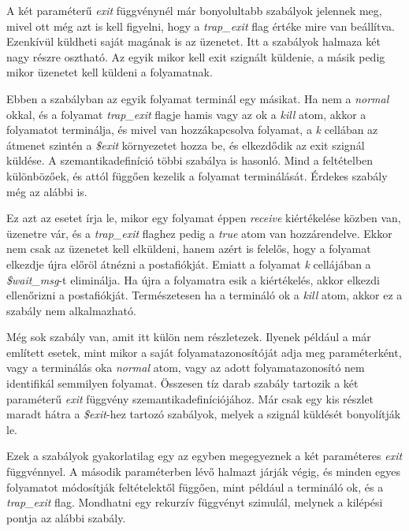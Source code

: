 A két paraméterű \textit{exit} függvénynél már bonyolultabb szabályok jelennek meg, mivel ott még azt is kell figyelni, hogy a \textit{trap\_exit} flag értéke mire van beállítva. Ezenkívül küldheti saját magának is az üzenetet. Itt a szabályok halmaza két nagy részre osztható. Az egyik mikor kell exit szignált küldenie, a másik pedig mikor üzenetet kell küldeni a folyamatnak.



Ebben a szabályban az egyik folyamat terminál egy másikat. Ha nem a \textit{normal} okkal, és a folyamat \textit{trap\_exit} flagje hamis vagy az ok a \textit{kill} atom, akkor a folyamatot terminálja, és mivel van hozzákapcsolva folyamat, a \textit{k} cellában az átmenet szintén a \textit{\$exit} környezetet hozza be, és elkezdődik az exit szignál küldése. A szemantikadefiníció többi szabálya is hasonló. Mind a feltételben különbözőek, és attól függően kezelik a folyamat terminálását. Érdekes szabály még az alábbi is.



Ez azt az esetet írja le, mikor egy folyamat éppen \textit{receive} kiértékelése közben van, üzenetre vár, és a \textit{trap\_exit} flaghez pedig a \textit{true} atom van hozzárendelve. Ekkor nem csak az üzenetet kell elküldeni, hanem azért is felelős, hogy a folyamat elkezdje újra előröl átnézni a postafiókját. Emiatt a folyamat \textit{k} cellájában a \textit{\$wait\_msg}-t eliminálja. Ha újra a folyamatra esik a kiértékelés, akkor elkezdi ellenőrizni a postafiókját. Természetesen ha a termináló ok a \textit{kill} atom, akkor ez a szabály nem alkalmazható.

Még sok szabály van, amit itt külön nem részletezek. Ilyenek például a már említett esetek, mint mikor a saját folyamatazonosítóját adja meg paraméterként, vagy a terminálás oka \textit{normal} atom, vagy az adott folyamatazonosító nem identifikál semmilyen folyamat. Összesen tíz darab szabály tartozik a két paraméterű \textit{exit} függvény szemantikadefiníciójához. Már csak egy kis részlet maradt hátra a \textit{\$exit}-hez tartozó szabályok, melyek a szignál küldését bonyolítják le.

Ezek a szabályok gyakorlatilag egy az egyben megegyeznek a két paraméteres \textit{exit} függvénnyel. A második paraméterben lévő halmazt járják végig, és minden egyes folyamatot módosítják feltételektől függően, mint például a termináló ok, és a \textit{trap\_exit} flag. Mondhatni egy rekurzív függvényt szimulál, melynek a kilépési pontja az alábbi szabály.


